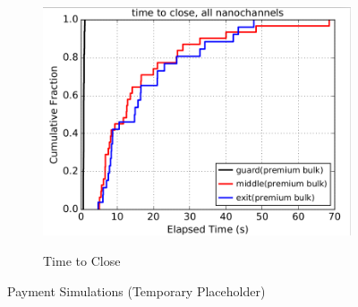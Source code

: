 \begin{figure}
\begin{subfigure}[t]{0.32\textwidth}
\includegraphics[scale=0.2]{images/ttclose_temp.png}
		\label{fig:payments_c}
		\caption{Time to Close}
	\end{subfigure}
	\label{fig:payments}
	\caption{Payment Simulations (Temporary Placeholder)}
\end{figure}


